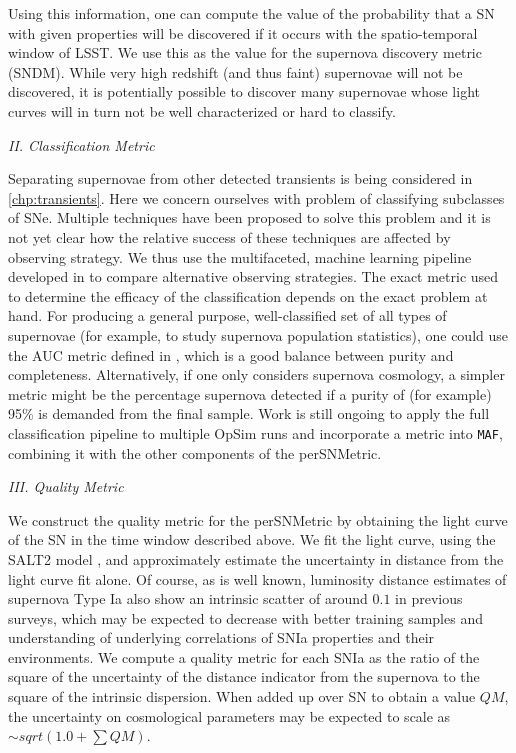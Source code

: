 Using this information, one can compute the value of the probability that a SN with given properties 
will be discovered if it occurs with the spatio-temporal window of LSST. We use this as the 
value for the supernova discovery metric (SNDM). While very high redshift (and thus faint) 
supernovae will not be discovered, it is 
potentially possible to discover many supernovae whose light curves will in turn not be well 
characterized or hard to classify.


\emph{II. Classification Metric}

Separating supernovae from other detected transients is being considered in 
\autoref{chp:transients}. Here we concern ourselves with problem of classifying subclasses of 
SNe. Multiple techniques have been proposed to solve this problem and it is not yet clear how the 
relative success of these techniques are affected by observing strategy. We thus use the 
multifaceted, machine learning pipeline developed in \citet{Lochner2016} to compare alternative 
observing strategies. The exact metric used to determine the efficacy of the classification depends 
on the exact problem at hand. For producing a general purpose, well-classified set of all types of 
supernovae (for example, to study supernova population statistics), one could use the AUC metric 
defined in \citet{Lochner2016}, which is a good balance between purity and completeness. 
Alternatively, if one only considers supernova cosmology, a simpler metric might be the percentage 
supernova detected if a purity of (for example) 95\% is demanded from the final sample. Work is 
still ongoing to apply the full classification pipeline to multiple OpSim runs and incorporate a 
metric into \texttt{MAF}, combining it with the other components of the perSNMetric.


\emph{III. Quality Metric}

We construct the quality metric for the perSNMetric by obtaining the
light curve of the SN in the time window described above. We fit the
light curve, using the SALT2 model \citep{Guy2007}, and approximately estimate the uncertainty in 
distance from
the light curve fit alone. Of course, as is well known, luminosity
distance estimates of supernova Type Ia also show an intrinsic scatter
of around $0.1$ in previous surveys, which may be expected to decrease
with better training samples and understanding of underlying
correlations of SNIa properties and their environments. We compute a
quality metric for each SNIa as the ratio of the square of the
uncertainty of the distance indicator from the supernova to the square
of the intrinsic dispersion. When added up over SN to obtain a value
$QM$, the uncertainty on cosmological parameters may be expected to
scale as $\sim sqrt(1.0 + \sum QM)$. 

